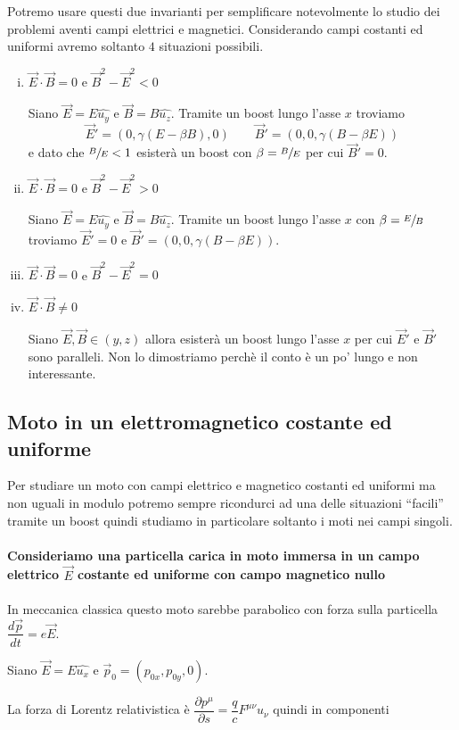 \documentclass[12pt,a4paper,titlepage, twoside, openright]{book}
\numberwithin{equation}{chapter}
\begin{document}
Potremo usare questi due invarianti per semplificare notevolmente lo studio dei problemi aventi campi elettrici e magnetici. Considerando campi costanti ed uniformi avremo soltanto $4$ situazioni possibili.
\begin{enumerate}[i.]
\item $\vec{E}\cdot\vec{B}=0$ e $\vec{B}^2-\vec{E}^2<0$\par
Siano $\vec{E}=E \hat{u_y}$ e $\vec{B}=B\hat{u_z}$. Tramite un boost lungo l'asse $x$ troviamo
\[
\vec{E}'=(0,\gamma(E-\beta B),0) \qquad \vec{B}'=(0,0, \gamma(B-\beta E))
\]
e dato che $\sfrac{B}{E}<1$ esisterà un boost con $\beta=\sfrac{B}{E}$ per cui $\vec{B}'=0$.
\item $\vec{E}\cdot\vec{B}=0$ e $\vec{B}^2-\vec{E}^2>0$\par
Siano $\vec{E}=E \hat{u_y}$ e $\vec{B}=B\hat{u_z}$. Tramite un boost lungo l'asse $x$ con $\beta=\sfrac{E}{B}$ troviamo $\vec{E}'=0$ e $\vec{B}'=(0,0, \gamma(B-\beta E))$.
\item $\vec{E}\cdot\vec{B}=0$ e $\vec{B}^2-\vec{E}^2=0$
\item $\vec{E}\cdot\vec{B}\neq0$\par Siano $\vec{E},\vec{B} \in (y,z)$ allora esisterà un boost lungo l'asse $x$ per cui $\vec{E}'$ e $\vec{B}'$ sono paralleli. Non lo dimostriamo perchè il conto è un po' lungo e non interessante.
\end{enumerate}


\subsection{Moto in un elettromagnetico costante ed uniforme}
Per studiare un moto con campi elettrico e magnetico costanti ed uniformi ma non uguali in modulo potremo sempre ricondurci ad una delle situazioni ``facili'' tramite un boost quindi studiamo in particolare soltanto i moti nei campi singoli.

\paragraph{Consideriamo una particella carica in moto immersa in un campo elettrico $\vec{E}$ costante ed uniforme con campo magnetico nullo}

In meccanica classica questo moto sarebbe parabolico con forza sulla particella $\dfrac{d\vec{p}}{dt}=e\vec{E}$.

Siano $\vec{E}=E\hat{u_x}$ e $\vec{p}_0=(p_{0x},p_{0y},0)$.

La forza di Lorentz relativistica è $\dfrac{\partial p^\mu}{\partial s}=\dfrac{q}{c}F^{\mu\nu}u_\nu$ quindi in componenti 
\end{document}

